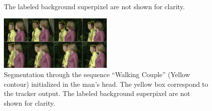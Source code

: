 {\begin{figure}[thpb]
{	        The labeled background superpixel are not shown for clarity.}
      \label{figurelabel_walking}
   \end{figure}
}{
   \begin{figure}[thpb]
      \centering
      \includegraphics[width=0.5\textwidth]{../images/Sequence.png}
      \caption{Segmentation through the sequence “Walking
	       Couple” (Yellow contour) initialized in the man’s head. The yellow box correspond to the tracker output.
	        The labeled background superpixel are not shown for clarity.}
      \label{figurelabel_walking}
   \end{figure}
}

